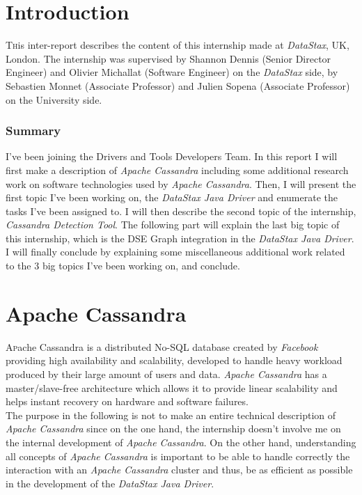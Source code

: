 \documentclass[a4paper]{report}
\newcommand{\ds}{\emph{DataStax\xspace}}
\newcommand{\djd}{\emph{DataStax Java Driver\xspace}}
\newcommand{\ca}{\emph{Apache Cassandra\xspace}}
\newcommand{\cdt}{\emph{Cassandra Detection Tool\xspace}}
\begin{document}


\chapter{Introduction}

\pagestyle{plain}
\lettrine[nindent=0em,lines=3]{T} his inter-report describes the content of this internship made at \ds{}, UK, London. The internship was supervised by Shannon Dennis (Senior Director Engineer) and Olivier Michallat (Software Engineer) on the \ds{} side, by Sebastien Monnet (Associate Professor) and Julien Sopena (Associate Professor) on the University side.\\
\subsection{Summary}
I've been joining the Drivers and Tools Developers Team. In this report I will first make a description of \ca{} including some additional research work on software technologies used by \ca{}. Then, I will present the first topic I've been working on, the \djd{} and enumerate the tasks I've been assigned to. I will then describe the second topic of the internship, \cdt{}. The following part will explain the last big topic of this internship, which is the DSE Graph integration in the \djd{}. I will finally conclude by explaining some miscellaneous additional work related to the 3 big topics I've been working on, and conclude.

\chapter{Apache Cassandra}
\lettrine[nindent=0em,lines=3]{A} pache Cassandra is a distributed No-SQL database created by \emph{Facebook} providing high availability and scalability, developed to handle heavy workload produced by their large amount of users and data. \ca{} has a master/slave-free architecture which allows it to provide linear scalability and helps instant recovery on hardware and software failures.\\
The purpose in the following is not to make an entire technical description of \ca{} since on the one hand, the internship doesn't involve me on the internal development of \ca{}. On the other hand, understanding all concepts of \ca{} is important to be able to handle correctly the interaction with an \ca{} cluster and thus, be as efficient as possible in the development of the \djd{}.
\end{document}
